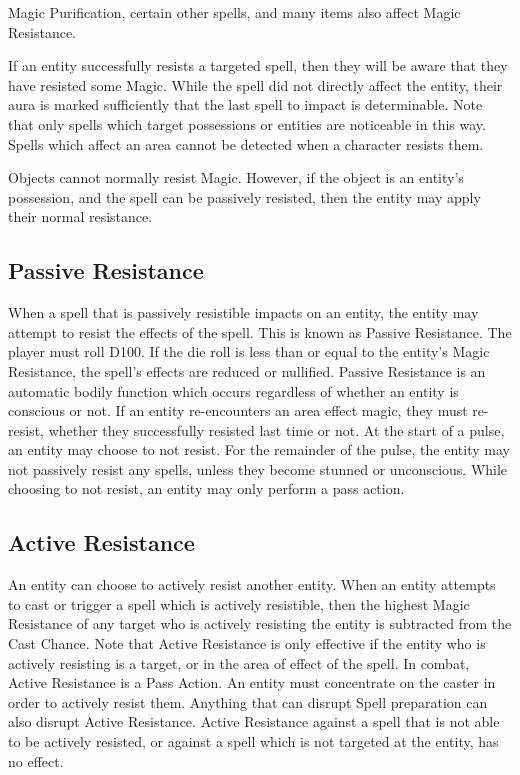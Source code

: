\begin{Chapter}{Magic}
Purification, certain other spells, and many items also affect Magic
Resistance.

If an entity successfully resists a targeted spell, then they will be
aware that they have resisted some Magic. While the spell did not
directly affect the entity, their aura is marked sufficiently that the
last spell to impact is determinable. Note that only spells which
target possessions or entities are noticeable in this way.  Spells
which affect an area cannot be detected when a character resists them.

Objects cannot normally resist Magic.  However, if the object is an
entity’s possession, and the spell can be passively resisted, then the
entity may apply their normal resistance.

\subsection{Passive Resistance}

When a spell that is passively resistible impacts on an entity, the
entity may attempt to resist the effects of the spell.  This is known
as Passive Resistance. The player must roll D100.  If the die roll is
less than or equal to the entity’s Magic Resistance, the spell’s
effects are reduced or nullified. Passive Resistance is an automatic
bodily function which occurs regardless of whether an entity is
conscious or not.  If an entity re-encounters an area effect magic,
they must re-resist, whether they successfully resisted last time or
not.  At the start of a pulse, an entity may choose to not resist.
For the remainder of the pulse, the entity may not passively resist
any spells, unless they become stunned or unconscious.  While choosing
to not resist, an entity may only perform a pass action.

\subsection{Active Resistance}

An entity can choose to actively resist another entity. When an entity
attempts to cast or trigger a spell which is actively resistible, then
the highest Magic Resistance of any target who is actively resisting
the entity is subtracted from the Cast Chance.  Note that Active
Resistance is only effective if the entity who is actively resisting
is a target, or in the area of effect of the spell. In combat, Active
Resistance is a Pass Action. An entity must concentrate on the caster
in order to actively resist them.  Anything that can disrupt Spell
preparation can also disrupt Active Resistance.  Active Resistance
against a spell that is not able to be actively resisted, or against a
spell which is not targeted at the entity, has no effect.



\end{Chapter}

